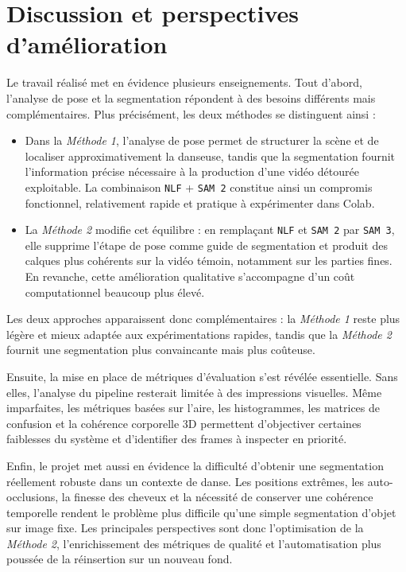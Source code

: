 \documentclass[11pt,a4paper]{article}
\begin{document}
\section{Discussion et perspectives d'amélioration}
Le travail réalisé met en évidence plusieurs enseignements.
Tout d'abord, l'analyse de pose et la segmentation répondent à des besoins différents mais complémentaires.
Plus précisément, les deux méthodes se distinguent ainsi :
\begin{itemize}
    \item Dans la \textit{Méthode 1}, l'analyse de pose permet de structurer la scène et de localiser approximativement la danseuse, tandis que la segmentation fournit l'information précise nécessaire à la production d'une vidéo détourée exploitable.
    La combinaison \texttt{NLF} + \texttt{SAM 2} constitue ainsi un compromis fonctionnel, relativement rapide et pratique à expérimenter dans Colab.
    \item La \textit{Méthode 2} modifie cet équilibre : en remplaçant \texttt{NLF} et \texttt{SAM 2} par \texttt{SAM 3}, elle supprime l'étape de pose comme guide de segmentation et produit des calques plus cohérents sur la vidéo témoin, notamment sur les parties fines.
    En revanche, cette amélioration qualitative s'accompagne d'un coût computationnel beaucoup plus élevé.
\end{itemize}
Les deux approches apparaissent donc complémentaires : la \textit{Méthode 1} reste plus légère et mieux adaptée aux expérimentations rapides, tandis que la \textit{Méthode 2} fournit une segmentation plus convaincante mais plus coûteuse.

Ensuite, la mise en place de métriques d'évaluation s'est révélée essentielle.
Sans elles, l'analyse du pipeline resterait limitée à des impressions visuelles.
Même imparfaites, les métriques basées sur l'aire, les histogrammes, les matrices de confusion et la cohérence corporelle 3D permettent d'objectiver certaines faiblesses du système et d'identifier des frames à inspecter en priorité.

Enfin, le projet met aussi en évidence la difficulté d'obtenir une segmentation réellement robuste dans un contexte de danse.
Les positions extrêmes, les auto-occlusions, la finesse des cheveux et la nécessité de conserver une cohérence temporelle rendent le problème plus difficile qu'une simple segmentation d'objet sur image fixe.
Les principales perspectives sont donc l'optimisation de la \textit{Méthode 2}, l'enrichissement des métriques de qualité et l'automatisation plus poussée de la réinsertion sur un nouveau fond.
\end{document}
